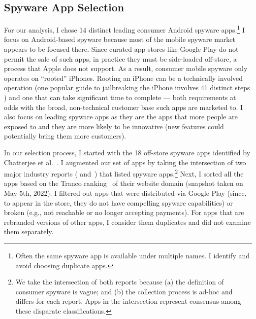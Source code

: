 \subsection{Spyware App Selection}
\label{subsec:app_selection}



For our analysis, I chose 14 distinct leading consumer Android spyware
apps.\footnote{Often the same spyware app is available under multiple
  names. I identify and avoid choosing duplicate apps.}  I focus on
Android-based spyware because most of the mobile spyware market
appears to be focused there. Since curated app stores like Google Play do not permit
the sale of such apps, in practice they must be side-loaded off-store, a process
that Apple does not support.  As a result, consumer mobile spyware only operates on ``rooted'' iPhones.  Rooting an iPhone can be a
technically involved operation (one popular guide to jailbreaking the
iPhone involves 41 distinct steps \cite{howToJailbreakIphone:online}) and one that can take significant
time to complete --- both requirements at odds with the broad,
non-technical customer base such apps are marketed to. I also focus on leading spyware apps as they are the apps that more people are exposed to and they are more likely to be innovative (new features could potentially bring them more customers).

In our selection process, I started with the 18 off-store spyware apps identified by Chatterjee et al.~\cite{chatterjee2018spyware}. I augmented our set of apps by taking the intersection of two major industry reports (\cite{esetandr4:online} and~\cite{Tekstalk86:online}) that listed spyware apps.\footnote{We take the intersection of both reports because (a) the definition of consumer spyware is vague; and (b) the collection process is ad-hoc and differs for each report. Apps in the intersection represent consensus among these disparate classifications.} Next, I sorted all the apps based on the Tranco ranking~\cite{pochat2018tranco} of their website domain (snapshot taken on May 5th, 2022).  I filtered out apps that were distributed via Google Play (since, to appear in
the store, they do not have compelling spyware capabilities)
or broken (e.g., not reachable or no longer accepting payments).
For apps that are rebranded versions of other apps, I consider them duplicates and did not examine them separately.


